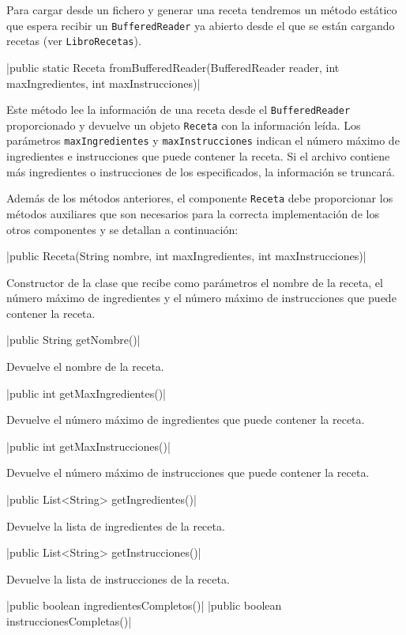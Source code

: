 \documentclass[
    a4paper, %
    12pt, %
]{CSSullivanBusinessReport}
\begin{document}
Para cargar desde un fichero y generar una receta tendremos un método estático que espera recibir un \texttt{BufferedReader} ya abierto desde el que se están cargando recetas (ver \texttt{LibroRecetas}).

|public static Receta fromBufferedReader(BufferedReader reader, int maxIngredientes, int maxInstrucciones)|

Este método lee la información de una receta desde el \texttt{BufferedReader} proporcionado y devuelve un objeto \texttt{Receta} con la información leída. Los parámetros \texttt{maxIngredientes} y \texttt{maxInstrucciones} indican el número máximo de ingredientes e instrucciones que puede contener la receta. Si el archivo contiene más ingredientes o instrucciones de los especificados, la información se truncará.

Además de los métodos anteriores, el componente \texttt{Receta} debe proporcionar los métodos auxiliares que son necesarios para la correcta implementación de los otros componentes y se detallan a continuación:

|public Receta(String nombre, int maxIngredientes, int maxInstrucciones)|

Constructor de la clase que recibe como parámetros el nombre de la receta, el número máximo de ingredientes y el número máximo de instrucciones que puede contener la receta.

|public String getNombre()|

Devuelve el nombre de la receta.

|public int getMaxIngredientes()|

Devuelve el número máximo de ingredientes que puede contener la receta.

|public int getMaxInstrucciones()|

Devuelve el número máximo de instrucciones que puede contener la receta.

|public List<String> getIngredientes()|

Devuelve la lista de ingredientes de la receta.

|public List<String> getInstrucciones()|

Devuelve la lista de instrucciones de la receta.

|public boolean ingredientesCompletos()|
|public boolean instruccionesCompletas()|
\end{document}
